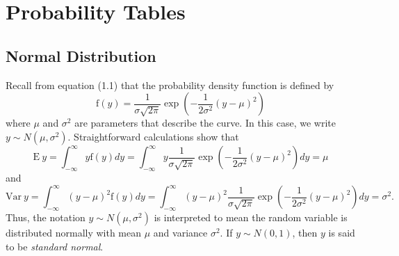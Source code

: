\chapter{Probability Tables}

\vspace{-1.5in}

\section{Normal Distribution}

Recall from equation (1.1) that the probability density function is
defined by
\begin{equation*}
\mathrm{f}(y)=\frac{1}{\sigma \sqrt{2\pi }}\exp \left(
-\frac{1}{2\sigma ^{2} }\left( y-\mu \right) ^{2}\right)
\end{equation*}
where $\mu$ and $\sigma^2$ are parameters that describe the curve.
In this case, we write $y \sim N(\mu,\sigma^2)$. Straightforward
calculations show that
\begin{equation*}
\mathrm{E}~y = \int_{-\infty}^{\infty} y \mathrm{f}(y) dy =
\int_{-\infty}^{\infty}  y \frac{1}{\sigma \sqrt{2\pi }}\exp \left(
-\frac{1}{2\sigma^2 }\left( y-\mu \right)^2 \right)  dy  = \mu
\end{equation*}
and
\begin{equation*}
\mathrm{Var}~y = \int_{-\infty}^{\infty} (y-\mu)^2 \mathrm{f}(y) dy
= \int_{-\infty}^{\infty} (y-\mu)^2 \frac{1}{\sigma \sqrt{2\pi
}}\exp \left( -\frac{1}{2\sigma^2 }\left( y-\mu \right)^2 \right) dy
= \sigma^2 .
\end{equation*}
Thus, the notation $y \sim N(\mu,\sigma^2)$ is interpreted to mean
the random variable is distributed normally with mean $\mu$ and
variance $\sigma^2$. If $y \sim N(0,1)$, then $y$ is said to be
\emph{standard normal}.

